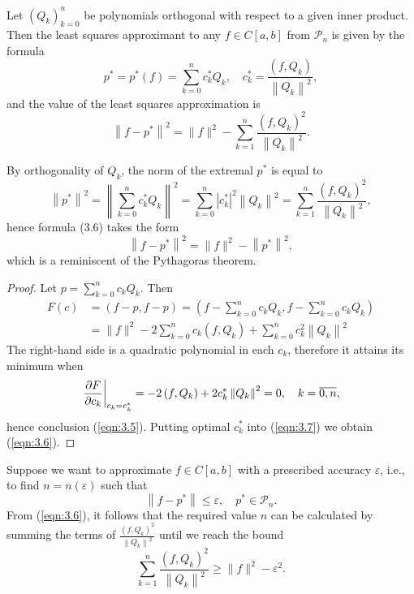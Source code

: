 \documentclass[a4paper]{article}
\renewcommand{\epsilon}{\varepsilon}
\begin{document}
\begin{theorem}
    Let $\left(Q_k\right)_{k=0}^n$ be polynomials orthogonal with respect to a given inner product. Then the least squares approximant to any $f \in C[a, b]$ from $\mathcal{P}_n$ is given by the formula
    \begin{equation}\label{eqn:3.5}
        p^*=p^*(f)=\sum_{k=0}^n c_k^* Q_k, \quad c_k^*=\frac{\left(f, Q_k\right)}{\left\|Q_k\right\|^2},
    \end{equation}
    and the value of the least squares approximation is
    \begin{equation}\label{eqn:3.6}
        \left\|f-p^*\right\|^2=\|f\|^2-\sum_{k=1}^n \frac{\left(f, Q_k\right)^2}{\left\|Q_k\right\|^2} .
    \end{equation}
\end{theorem}
\begin{remark}
    By orthogonality of $Q_k$, the norm of the extremal $p^*$ is equal to
    \[
    \left\|p^*\right\|^2=\left\|\sum_{k=0}^n c_k^* Q_k\right\|^2=\sum_{k=0}^n\left|c_k^*\right|^2\left\|Q_k\right\|^2=\sum_{k=1}^n \frac{\left(f, Q_k\right)^2}{\left\|Q_k\right\|^2},
    \]
    hence formula (3.6) takes the form
    \[
    \left\|f-p^*\right\|^2=\|f\|^2-\left\|p^*\right\|^2,
    \]
    which is a reminiscent of the Pythagoras theorem.
\end{remark}
\begin{proof}
    Let $p=\sum_{k=0}^n c_k Q_k$. Then
    \begin{align}\label{eqn:3.7}
        F(c)&=(f-p, f-p)=\left(f-\sum_{k=0}^n c_k Q_k, f-\sum_{k=0}^n c_k Q_k\right)\nonumber \\ 
        &=\|f\|^2-2 \sum_{k=0}^n c_k\left(f, Q_k\right)+\sum_{k=0}^n c_k^2\left\|Q_k\right\|^2
    \end{align}
    The right-hand side is a quadratic polynomial in each $c_k$, therefore it attains its minimum when
    \[
    \eval{\frac{\partial F}{\partial c_k}}_{c_k=c_k^*}=-2\left(f, Q_k\right)+2 c_k^*\left\|Q_k\right\|^2=0, \quad k=\overline{0, n},
    \]
    hence conclusion (\ref{eqn:3.5}). Putting optimal $c_k^*$ into (\ref{eqn:3.7}) we obtain (\ref{eqn:3.6}).
\end{proof}

\begin{method}
    Suppose we want to approximate $f \in C[a, b]$ with a prescribed accuracy $\epsilon$, i.e., to find $n=n(\epsilon)$ such that
    \[
    \left\|f-p^*\right\| \leq \epsilon, \quad p^* \in \mathcal{P}_n .
    \]
    From (\ref{eqn:3.6}), it follows that the required value $n$ can be calculated by summing the terms of $\frac{\left(f, Q_k\right)^2}{\left\|Q_k\right\|^2}$ until we reach the bound
    \[
    \sum_{k=1}^n \frac{\left(f, Q_k\right)^2}{\left\|Q_k\right\|^2} \geq\|f\|^2-\epsilon^2 .
    \]
\end{method}
\end{document}
